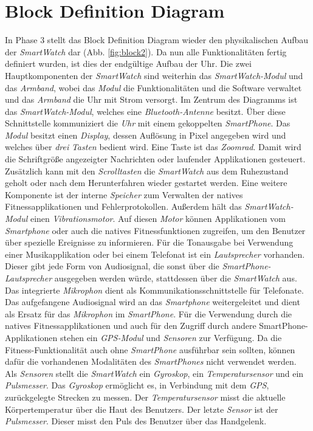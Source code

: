 \section{Block Definition Diagram}
In Phase 3 stellt das Block Definition Diagram wieder den physikalischen Aufbau der \textit{SmartWatch} dar (Abb. \ref{fig:block2}). Da nun alle Funktionalitäten fertig definiert wurden, ist dies der endgültige Aufbau der Uhr. Die zwei Hauptkomponenten der \textit{SmartWatch} sind weiterhin das \textit{SmartWatch-Modul} und das \textit{Armband}, wobei das \textit{Modul} die Funktionalitäten und die Software verwaltet und das \textit{Armband} die Uhr mit Strom versorgt. Im Zentrum des Diagramms ist das \textit{SmartWatch-Modul}, welches eine \textit{Bluetooth-Antenne} besitzt. Über diese Schnittstelle kommuniziert die \textit{Uhr} mit einem gekoppelten \textit{SmartPhone}. Das \textit{Modul} besitzt einen \textit{Display}, dessen Auflösung in Pixel angegeben wird und welches über \textit{drei} \textit{Tasten} bedient wird. Eine Taste ist das \textit{Zoomrad}. Damit wird die Schriftgröße angezeigter Nachrichten oder laufender Applikationen gesteuert. Zusätzlich kann mit den \textit{Scrolltasten} die \textit{SmartWatch} aus dem Ruhezustand geholt oder nach dem Herunterfahren wieder gestartet werden. Eine weitere Komponente ist der interne \textit{Speicher} zum Verwalten der \glspl{native} Fitnessapplikationen und Fehlerprotokollen. Außerdem hält das \textit{SmartWatch-Modul} einen \textit{Vibrationsmotor}. Auf diesen \textit{Motor} können Applikationen vom \textit{Smartphone} oder auch die \glspl{native} Fitnessfunktionen zugreifen, um den Benutzer über spezielle Ereignisse zu informieren. Für die Tonausgabe bei Verwendung einer Musikapplikation oder bei einem Telefonat ist ein \textit{Lautsprecher} vorhanden. Dieser gibt jede Form von Audiosignal, die sonst über die \textit{SmartPhone-Lautsprecher} ausgegeben werden würde, stattdessen über die \textit{SmartWatch} aus. Das integrierte \textit{Mikrophon} dient als Kommunikationsschnittstelle für Telefonate. Das aufgefangene Audiosignal wird an das \textit{Smartphone} weitergeleitet und dient als Ersatz für das \textit{Mikrophon} im \textit{SmartPhone}. Für die Verwendung durch die \glspl{native} Fitnessapplikationen und auch für den Zugriff durch andere SmartPhone-Applikationen stehen ein \textit{GPS-Modul} und \textit{Sensoren} zur Verfügung. Da die Fitness-Funktionalität auch ohne \textit{SmartPhone} ausführbar sein sollten, können dafür die vorhandenen Modalitäten des \textit{SmartPhones} nicht verwendet werden. Als \textit{Sensoren} stellt die \textit{SmartWatch} ein \textit{Gyroskop}, ein \textit{Temperatursensor} und ein \textit{Pulsmesser}. Das \textit{Gyroskop} ermöglicht es, in Verbindung mit dem \textit{GPS}, zurückgelegte Strecken zu messen. Der \textit{Temperatursensor} misst die aktuelle Körpertemperatur über die Haut des Benutzers. Der letzte \textit{Sensor} ist der \textit{Pulsmesser}. Dieser misst den Puls des Benutzer über das Handgelenk.\\
